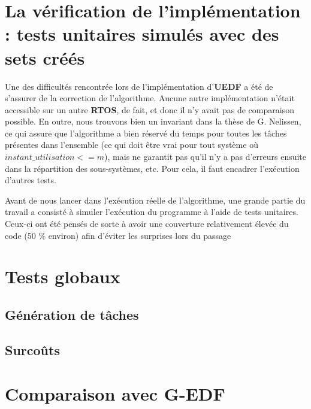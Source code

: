 	

\section{La vérification de l'implémentation : tests unitaires simulés avec des sets créés}

	Une des difficultés rencontrée lors de l'implémentation d'\textbf{UEDF} a été de s'assurer de la correction de l'algorithme. 
	Aucune autre implémentation n'était accessible sur un autre \textbf{RTOS}, de fait, et donc il n'y avait pas de 
	comparaison possible. En outre, nous trouvons bien un invariant dans la thèse de G. Nelissen, ce qui assure 
	que l'algorithme a bien réservé du temps pour toutes les tâches présentes dans l'ensemble 
	(ce qui doit être vrai pour tout système où $instant\_utilisation <= m$), mais ne garantit pas 
	qu'il n'y a pas d'erreurs ensuite dans la répartition des sous-systèmes, etc. Pour cela, il faut encadrer 
	l'exécution d'autres tests. \newline

	Avant de nous lancer dans l'exécution réelle de l'algorithme, une grande partie du travail a consisté 
	à simuler l'exécution du programme à l'aide de tests unitaires. Ceux-ci ont été pensés de sorte à avoir 
	une couverture relativement élevée du code (50 \% environ) afin d'éviter les surprises lors du passage 
	

\section{Tests globaux}

\subsection{Génération de tâches}

\subsection{Surcoûts}

\section{Comparaison avec G-EDF}
